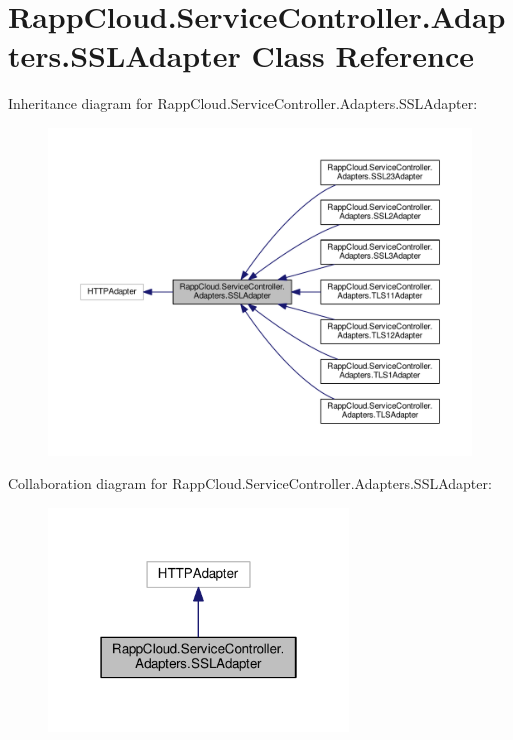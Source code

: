 \hypertarget{classRappCloud_1_1ServiceController_1_1Adapters_1_1SSLAdapter}{\section{Rapp\-Cloud.\-Service\-Controller.\-Adapters.\-S\-S\-L\-Adapter Class Reference}
\label{classRappCloud_1_1ServiceController_1_1Adapters_1_1SSLAdapter}
}


Inheritance diagram for Rapp\-Cloud.\-Service\-Controller.\-Adapters.\-S\-S\-L\-Adapter\-:
\nopagebreak
\begin{figure}[H]
\begin{center}
\leavevmode
\includegraphics[width=350pt]{classRappCloud_1_1ServiceController_1_1Adapters_1_1SSLAdapter__inherit__graph}
\end{center}
\end{figure}


Collaboration diagram for Rapp\-Cloud.\-Service\-Controller.\-Adapters.\-S\-S\-L\-Adapter\-:
\nopagebreak
\begin{figure}[H]
\begin{center}
\leavevmode
\includegraphics[width=226pt]{classRappCloud_1_1ServiceController_1_1Adapters_1_1SSLAdapter__coll__graph}
\end{center}
\end{figure}
